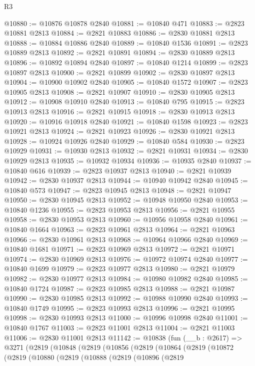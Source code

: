 \begin{lexlean}{R3}
\begin{coremodule}
@10880 := @10876 @10878 @2840
@10881 := @10840 @471
@10883 := @2823 @10881 @2813
@10884 := @2821 @10883
@10886 := @2830 @10881 @2813
@10888 := @10884 @10886 @2840
@10889 := @10840 @1536
@10891 := @2823 @10889 @2813
@10892 := @2821 @10891
@10894 := @2830 @10889 @2813
@10896 := @10892 @10894 @2840
@10897 := @10840 @1214
@10899 := @2823 @10897 @2813
@10900 := @2821 @10899
@10902 := @2830 @10897 @2813
@10904 := @10900 @10902 @2840
@10905 := @10840 @1572
@10907 := @2823 @10905 @2813
@10908 := @2821 @10907
@10910 := @2830 @10905 @2813
@10912 := @10908 @10910 @2840
@10913 := @10840 @795
@10915 := @2823 @10913 @2813
@10916 := @2821 @10915
@10918 := @2830 @10913 @2813
@10920 := @10916 @10918 @2840
@10921 := @10840 @1598
@10923 := @2823 @10921 @2813
@10924 := @2821 @10923
@10926 := @2830 @10921 @2813
@10928 := @10924 @10926 @2840
@10929 := @10840 @584
@10930 := @2823 @10929
@10931 := @10930 @2813
@10932 := @2821 @10931
@10934 := @2830 @10929 @2813
@10935 := @10932 @10934
@10936 := @10935 @2840
@10937 := @10840 @616
@10939 := @2823 @10937 @2813
@10940 := @2821 @10939
@10942 := @2830 @10937 @2813
@10944 := @10940 @10942 @2840
@10945 := @10840 @573
@10947 := @2823 @10945 @2813
@10948 := @2821 @10947
@10950 := @2830 @10945 @2813
@10952 := @10948 @10950 @2840
@10953 := @10840 @1236
@10955 := @2823 @10953 @2813
@10956 := @2821 @10955
@10958 := @2830 @10953 @2813
@10960 := @10956 @10958 @2840
@10961 := @10840 @1664
@10963 := @2823 @10961 @2813
@10964 := @2821 @10963
@10966 := @2830 @10961 @2813
@10968 := @10964 @10966 @2840
@10969 := @10840 @1681
@10971 := @2823 @10969 @2813
@10972 := @2821 @10971
@10974 := @2830 @10969 @2813
@10976 := @10972 @10974 @2840
@10977 := @10840 @1699
@10979 := @2823 @10977 @2813
@10980 := @2821 @10979
@10982 := @2830 @10977 @2813
@10984 := @10980 @10982 @2840
@10985 := @10840 @1724
@10987 := @2823 @10985 @2813
@10988 := @2821 @10987
@10990 := @2830 @10985 @2813
@10992 := @10988 @10990 @2840
@10993 := @10840 @1749
@10995 := @2823 @10993 @2813
@10996 := @2821 @10995
@10998 := @2830 @10993 @2813
@11000 := @10996 @10998 @2840
@11001 := @10840 @1767
@11003 := @2823 @11001 @2813
@11004 := @2821 @11003
@11006 := @2830 @11001 @2813
@11142 := @10838
    (fun (__b : @2617) =>
    @3271
      (@2819
        (@10848
          (@2819
            (@10856
              (@2819
                (@10864
                  (@2819
                    (@10872
                      (@2819
                        (@10880
                          (@2819
                            (@10888
                              (@2819
                                (@10896
                                  (@2819

\end{coremodule}
\end{lexlean}
